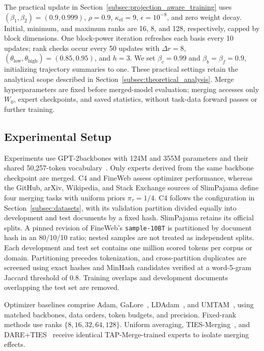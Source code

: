 \documentclass[fleqn,10pt]{wlscirep}
\begin{document}
The practical update in
Section~\ref{subsec:projection_aware_training} uses
$(\beta_1,\beta_2)=(0.9,0.999)$, $\rho=0.9$,
$\kappa_{\mathrm{ef}}=9$, $\epsilon=10^{-8}$, and zero weight
decay. Initial, minimum, and maximum ranks are 16, 8, and 128,
respectively, capped by block dimensions. One block-power
iteration refreshes each basis every 10 updates; rank checks
occur every 50 updates with $\Delta r=8$,
$(\theta_{\mathrm{low}},\theta_{\mathrm{high}})=(0.85,0.95)$,
and $h=3$. We set $\beta_c=0.99$ and
$\beta_b=\beta_f=0.9$, initializing trajectory summaries to one.
These practical settings retain the analytical scope described
in Section~\ref{subsec:theoretical_analysis}.
Merge hyperparameters are fixed before merged-model evaluation;
merging accesses only $W_0$, expert checkpoints, and saved
statistics, without task-data forward passes or further training.


\subsection{Experimental Setup}
\label{subsec:experimental_setup}

Experiments use GPT-2backbones with 124M and 355M parameters
and their shared 50,257-token vocabulary~\cite{radford2019language}.
Only experts derived from the same backbone checkpoint are
merged. C4 and FineWeb assess optimizer performance, whereas
the GitHub, arXiv, Wikipedia, and Stack Exchange sources of
SlimPajama define four merging tasks with uniform priors
$\pi_{\tau}=1/4$. C4 follows the configuration in
Section~\ref{subsec:datasets}, with its validation partition
divided equally into development and test documents by a fixed
hash. SlimPajama retains its official splits. A pinned revision
of FineWeb's \texttt{sample-10BT} is partitioned by document
hash in an 80/10/10 ratio; nested samples are not treated as
independent splits. Each development and test set contains
one million scored tokens per corpus or domain. Partitioning
precedes tokenization, and cross-partition duplicates are
screened using exact hashes and MinHash candidates verified
at a word-5-gram Jaccard threshold of 0.8. Training overlaps
and development documents overlapping the test set are removed.

Optimizer baselines comprise Adam, GaLore~\cite{galore2024},
LDAdam~\cite{ldadam2025}, and UMTAM~\cite{umtam2026}, using
matched backbones, data orders, token budgets, and precision.
Fixed-rank methods use ranks $\{8,16,32,64,128\}$.
Uniform averaging, TIES-Merging~\cite{yadav2023ties}, and
DARE+TIES~\cite{dare2024} receive identical TAP-Merge-trained
experts to isolate merging effects.
\end{document}
